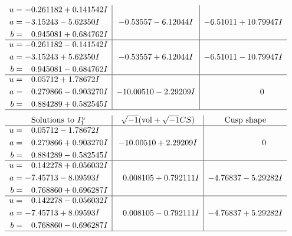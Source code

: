 \documentclass[1p]{elsarticle_modified}
\theoremstyle{definition}
\newcommand{\I}{\sqrt{-1}}
\begin{document}
$$\begin{array}{c|c|c}
\begin{aligned}
u &= -0.261182 + 0.141542 I \\
a &= -3.15243 - 5.62350 I \\
b &= \phantom{-}0.945081 + 0.684762 I\end{aligned}
 & -0.53557 - 6.12044 I & -6.51011 + 10.79947 I \\ \hline\begin{aligned}
u &= -0.261182 - 0.141542 I \\
a &= -3.15243 + 5.62350 I \\
b &= \phantom{-}0.945081 - 0.684762 I\end{aligned}
 & -0.53557 + 6.12044 I & -6.51011 - 10.79947 I \\ \hline\begin{aligned}
u &= \phantom{-}0.05712 + 1.78672 I \\
a &= \phantom{-}0.279866 - 0.903270 I \\
b &= \phantom{-}0.884289 + 0.582545 I\end{aligned}
 & -10.00510 - 2.29209 I & \phantom{-0.000000 } 0\\
 \hline 
 \end{array}$$\newpage$$\begin{array}{c|c|c}  
\text{Solutions to }I^u_{1}& \I (\text{vol} + \sqrt{-1}CS) & \text{Cusp shape}\\
 \hline 
\begin{aligned}
u &= \phantom{-}0.05712 - 1.78672 I \\
a &= \phantom{-}0.279866 + 0.903270 I \\
b &= \phantom{-}0.884289 - 0.582545 I\end{aligned}
 & -10.00510 + 2.29209 I & \phantom{-0.000000 } 0 \\ \hline\begin{aligned}
u &= \phantom{-}0.142278 + 0.056032 I \\
a &= -7.45713 - 8.09593 I \\
b &= \phantom{-}0.768860 + 0.696287 I\end{aligned}
 & \phantom{-}0.008105 + 0.792111 I & -4.76837 - 5.29282 I \\ \hline\begin{aligned}
u &= \phantom{-}0.142278 - 0.056032 I \\
a &= -7.45713 + 8.09593 I \\
b &= \phantom{-}0.768860 - 0.696287 I\end{aligned}
 & \phantom{-}0.008105 - 0.792111 I & -4.76837 + 5.29282 I\\
 \hline 
 \end{array}$$\newpage\newpage\renewcommand{\arraystretch}{1}
\end{document}
